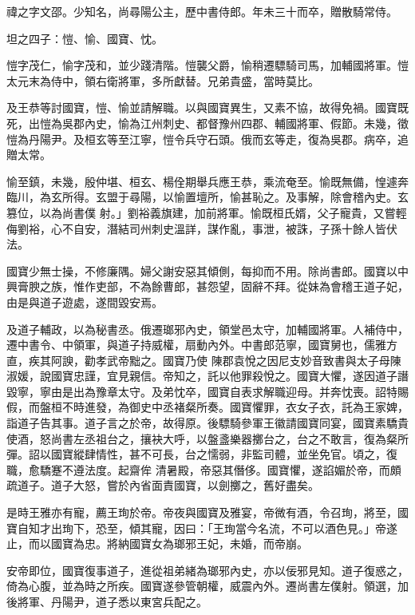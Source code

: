\begin{pinyinscope}
 禕之字文邵。少知名，尚尋陽公主，歷中書侍郎。年未三十而卒，贈散騎常侍。



 坦之四子：愷、愉、國寶、忱。



 愷字茂仁，愉字茂和，並少踐清階。愷襲父爵，愉稍遷驃騎司馬，加輔國將軍。愷太元末為侍中，領右衛將軍，多所獻替。兄弟貴盛，當時莫比。



 及王恭等討國寶，愷、愉並請解職。以與國寶異生，又素不協，故得免禍。國寶既死，出愷為吳郡內史，愉為江州刺史、都督豫州四郡、輔國將軍、假節。未幾，徵愷為丹陽尹。及桓玄等至江寧，愷令兵守石頭。俄而玄等走，復為吳郡。病卒，追贈太常。



 愉至鎮，未幾，殷仲堪、桓玄、楊佺期舉兵應王恭，乘流奄至。愉既無備，惶遽奔臨川，為玄所得。玄盟于尋陽，以愉置壇所，愉甚恥之。及事解，除會稽內史。玄篡位，以為尚書僕
 射。」劉裕義旗建，加前將軍。愉既桓氏婿，父子寵貴，又嘗輕侮劉裕，心不自安，潛結司州刺史溫詳，謀作亂，事泄，被誅，子孫十餘人皆伏法。



 國寶少無士操，不修廉隅。婦父謝安惡其傾側，每抑而不用。除尚書郎。國寶以中興膏腴之族，惟作吏部，不為餘曹郎，甚怨望，固辭不拜。從妹為會稽王道子妃，由是與道子遊處，遂間毀安焉。



 及道子輔政，以為秘書丞。俄遷瑯邪內史，領堂邑太守，加輔國將軍。人補侍中，遷中書令、中領軍，與道子持威權，扇動內外。中書郎范寧，國寶舅也，儒雅方直，疾其阿諛，勸孝武帝黜之。國寶乃使
 陳郡袁悅之因尼支妙音致書與太子母陳淑媛，說國寶忠謹，宜見親信。帝知之，託以他罪殺悅之。國寶大懼，遂因道子譖毀寧，寧由是出為豫章太守。及弟忱卒，國寶自表求解職迎母。并奔忱喪。詔特賜假，而盤桓不時進發，為御史中丞褚粲所奏。國寶懼罪，衣女子衣，託為王家婢，詣道子告其事。道子言之於帝，故得原。後驃騎參軍王徽請國寶同宴，國寶素驕貴使酒，怒尚書左丞祖台之，攘袂大呼，以盤盞樂器擲台之，台之不敢言，復為粲所彈。詔以國寶縱肆情性，甚不可長，台之懦弱，非監司體，並坐免官。頃之，復職，愈驕蹇不遵法度。起齋侔
 清暑殿，帝惡其僭侈。國寶懼，遂諂媚於帝，而頗疏道子。道子大怒，嘗於內省面責國寶，以劍擲之，舊好盡矣。



 是時王雅亦有寵，薦王珣於帝。帝夜與國寶及雅宴，帝微有酒，令召珣，將至，國寶自知才出珣下，恐至，傾其寵，因曰：「王珣當今名流，不可以酒色見。」帝遂止，而以國寶為忠。將納國寶女為瑯邪王妃，未婚，而帝崩。



 安帝即位，國寶復事道子，進從祖弟緒為瑯邪內史，亦以佞邪見知。道子復惑之，倚為心腹，並為時之所疾。國寶遂參管朝權，威震內外。遷尚書左僕射。領選，加後將軍、丹陽尹，道子悉以東宮兵配之。




\end{pinyinscope}
